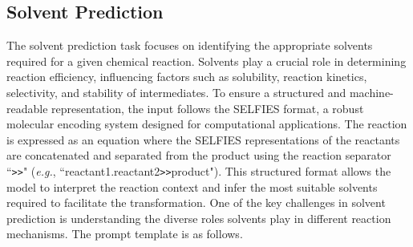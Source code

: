 \subsection{Solvent Prediction}
The solvent prediction task focuses on identifying the appropriate solvents required for a given chemical reaction. Solvents play a crucial role in determining reaction efficiency, influencing factors such as solubility, reaction kinetics, selectivity, and stability of intermediates. To ensure a structured and machine-readable representation, the input follows the SELFIES format, a robust molecular encoding system designed for computational applications. The reaction is expressed as an equation where the SELFIES representations of the reactants are concatenated and separated from the product using the reaction separator ``{\tt >>}" (\emph{e.g.}, ``reactant1.reactant2{\tt >>}product"). This structured format allows the model to interpret the reaction context and infer the most suitable solvents required to facilitate the transformation.
One of the key challenges in solvent prediction is understanding the diverse roles solvents play in different reaction mechanisms. The prompt template is as follows.

